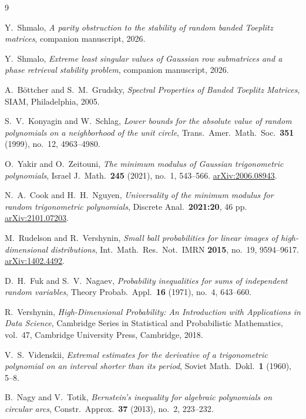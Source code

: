 \documentclass[11pt]{amsart}
\numberwithin{equation}{section}
\theoremstyle{definition}
\theoremstyle{remark}
\begin{document}
\begin{thebibliography}{9}

Y.~Shmalo,
\emph{A parity obstruction to the stability of random banded Toeplitz matrices},
companion manuscript, 2026.

Y.~Shmalo,
\emph{Extreme least singular values of Gaussian row submatrices and a phase retrieval stability problem},
companion manuscript, 2026.

A.~B\"ottcher and S.~M.~Grudsky,
\emph{Spectral Properties of Banded Toeplitz Matrices},
SIAM, Philadelphia, 2005.

S.~V.~Konyagin and W.~Schlag,
\emph{Lower bounds for the absolute value of random polynomials on a neighborhood of the unit circle},
Trans.\ Amer.\ Math.\ Soc.\ \textbf{351} (1999), no.~12, 4963--4980.

O.~Yakir and O.~Zeitouni,
\emph{The minimum modulus of Gaussian trigonometric polynomials},
Israel J.\ Math.\ \textbf{245} (2021), no.~1, 543--566.
\href{https://arxiv.org/abs/2006.08943}{arXiv:2006.08943}.

N.~A.~Cook and H.~H.~Nguyen,
\emph{Universality of the minimum modulus for random trigonometric polynomials},
Discrete Anal.\ \textbf{2021:20}, 46 pp.
\href{https://arxiv.org/abs/2101.07203}{arXiv:2101.07203}.

M.~Rudelson and R.~Vershynin,
\emph{Small ball probabilities for linear images of high-dimensional distributions},
Int.\ Math.\ Res.\ Not.\ IMRN \textbf{2015}, no.~19, 9594--9617.
\href{https://arxiv.org/abs/1402.4492}{arXiv:1402.4492}.

D.~H.~Fuk and S.~V.~Nagaev,
\emph{Probability inequalities for sums of independent random variables},
Theory Probab.\ Appl.\ \textbf{16} (1971), no.~4, 643--660.

R.~Vershynin,
\emph{High-Dimensional Probability: An Introduction with Applications in Data Science},
Cambridge Series in Statistical and Probabilistic Mathematics, vol.~47,
Cambridge University Press, Cambridge, 2018.

V.~S.~Videnskii,
\emph{Extremal estimates for the derivative of a trigonometric polynomial on an interval shorter than its period},
Soviet Math.\ Dokl.\ \textbf{1} (1960), 5--8.

B.~Nagy and V.~Totik,
\emph{Bernstein's inequality for algebraic polynomials on circular arcs},
Constr.\ Approx.\ \textbf{37} (2013), no.~2, 223--232.


\end{thebibliography}
\end{document}
